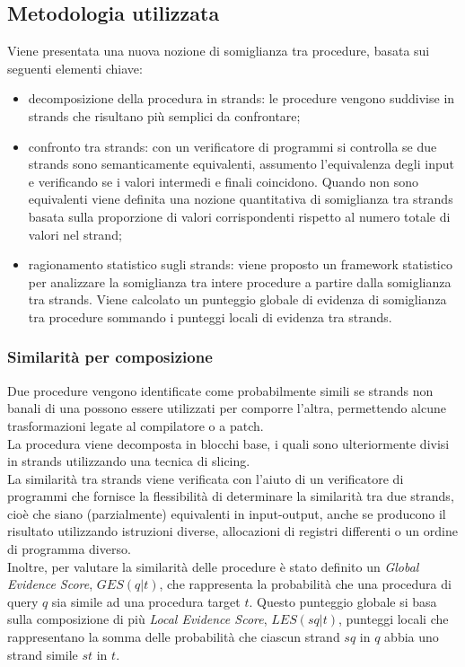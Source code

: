 \documentclass[12pt,a4paper,openright,twoside]{report}
\begin{document}
\subsection{Metodologia utilizzata}

Viene presentata una nuova nozione di somiglianza tra procedure, basata sui seguenti elementi chiave:
\begin{itemize}
    \item decomposizione della procedura in strands: le procedure vengono suddivise in strands che risultano più semplici da confrontare;
    \item confronto tra strands: con un verificatore di programmi si controlla se due strands sono semanticamente equivalenti, assumento l'equivalenza degli input e verificando se i valori intermedi e finali coincidono. Quando non sono equivalenti viene definita una nozione quantitativa di somiglianza tra strands basata sulla proporzione di valori corrispondenti rispetto al numero totale di valori nel strand;
    \item ragionamento statistico sugli strands: viene proposto un framework statistico per analizzare la somiglianza tra intere procedure a partire dalla somiglianza tra strands. Viene calcolato un punteggio globale  di evidenza di somiglianza tra procedure sommando i punteggi locali di evidenza tra strands.
\end{itemize}

\subsubsection{Similarità per composizione}

Due procedure vengono identificate come probabilmente simili se strands non banali di una possono essere utilizzati per comporre l'altra, permettendo alcune trasformazioni legate al compilatore o a patch.\\
La procedura viene decomposta in blocchi base, i quali sono ulteriormente divisi in strands utilizzando una tecnica di slicing.\\
La similarità tra strands viene verificata con l'aiuto di un verificatore di programmi che fornisce la flessibilità di determinare la similarità tra due strands, cioè che siano (parzialmente) equivalenti in input-output, anche se producono il risultato utilizzando istruzioni diverse, allocazioni di registri differenti o un ordine di programma diverso.\\
Inoltre, per valutare la similarità delle procedure è stato definito un \textit{Global Evidence Score}, $GES(q|t)$, che rappresenta la probabilità che una procedura di query $q$ sia simile ad una procedura target $t$. Questo punteggio globale si basa sulla composizione di più \textit{Local Evidence Score}, $LES(sq|t)$, punteggi locali che rappresentano la somma delle probabilità che ciascun strand $sq$ in $q$ abbia uno strand simile $st$ in $t$.
\end{document}
